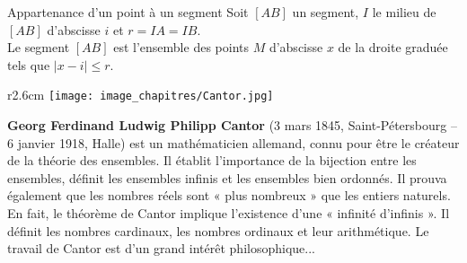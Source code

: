 
\begin{ThT}{Appartenance d'un point à un segment}
Soit $[AB]$ un segment, $I$ le milieu de $[AB]$ d'abscisse $i$ et $r = IA = IB$.\\
Le segment $[AB]$ est l'ensemble des points $M$ d'abscisse $x$ de la droite graduée tels que $\vert x- i \vert \leq r$.
\end{ThT}






 
 
 








\begin{His}

\begin{wrapfigure}[12]{r}{2.6cm}
\vspace{-7mm}
\texttt{[image: image\_chapitres/Cantor.jpg]}
\end{wrapfigure}

\textbf{Georg Ferdinand Ludwig Philipp Cantor} (3 mars 1845, Saint-Pétersbourg – 6 janvier 1918, Halle) est un mathématicien allemand, connu pour être le créateur de la théorie des ensembles. Il établit l'importance de la bijection entre les ensembles, définit les ensembles infinis et les ensembles bien ordonnés. Il prouva également que les nombres réels sont « plus nombreux » que les entiers naturels. En fait, le théorème de Cantor implique l'existence d'une « infinité d'infinis ». Il définit les nombres cardinaux, les nombres ordinaux et leur arithmétique. Le travail de Cantor est d'un grand intérêt philosophique...
\end{His}